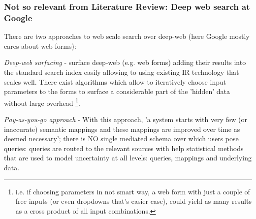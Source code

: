 \documentclass[a4paper,11pt]{article}
\begin{document}
\pagebreak


\pagebreak


{\color{gray}
\subsubsection*{Not so relevant from Literature Review: Deep web search at Google}

There are two approaches to web scale search over deep-web (here Google mostly cares about web forms): 

\textit{Deep-web surfacing} - surface deep-web (e.g. web forms) adding their results into the standard search index  easily allowing to using existing IR technology that scales well. There exist algorithms which allow to iteratively choose input parameters to the forms to surface a considerable part of the 'hidden' data without large overhead%
	\footnote{i.e. if choosing parameters in not smart way, a web form with just a couple of free inputs (or even dropdowns that's easier case), could yield as many results as a cross product of all input combinations.}.

\textit{Pay-as-you-go approach}\cite{webscale_paygo} - With this approach, 'a system starts with
very few (or inaccurate) semantic mappings and these mappings are improved over time as deemed necessary';
there is NO single mediated schema over which users pose queries: queries are routed to the relevant sources with help statistical methods that are used to model uncertainty at all levels: queries, mappings and underlying data. 
}
\end{document}
